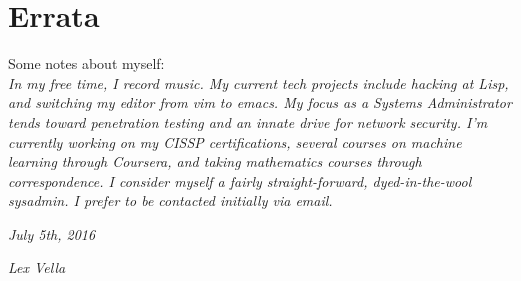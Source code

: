\documentclass[]{vella-cv}
\begin{document}
\section{Errata}
Some notes about myself:\\
\emph{In my free time, I record music. My current tech projects include hacking at Lisp, and switching my editor from vim to emacs. My focus as a Systems Administrator tends toward penetration testing and an innate drive for network security. I'm currently working on my CISSP certifications, several courses on machine learning through Coursera, and taking mathematics courses through correspondence. I consider myself a fairly straight-forward, dyed-in-the-wool sysadmin. I prefer to be contacted initially via email.}
\\
\begin{flushleft}
\emph{July 5th, 2016}
\end{flushleft}
\begin{flushright}
\emph{Lex Vella}
\end{flushright}
\end{document}
